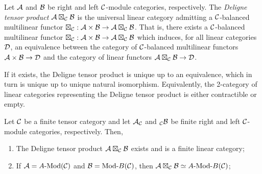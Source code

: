 \documentclass[a4paper]{amsart}
\begin{document}
\begin{definition}
	Let $\mathcal A$ and $\mathcal B$ be right and left $\mathcal C$-module categories, respectively. The {\em Deligne tensor product $\mathcal A \boxtimes_{\mathcal C} \mathcal B$} is the universal linear category admitting a $\mathcal C$-balanced multilinear functor $\boxtimes_{\mathcal C}: \mathcal A \times \mathcal B \to \mathcal A \boxtimes_{\mathcal C} \mathcal B$. That is, there exists a $\mathcal C$-balanced multilinear functor $\boxtimes_{\mathcal C}: \mathcal A \times \mathcal B \to \mathcal A \boxtimes_{\mathcal C} \mathcal B$ which induces, for all linear categories $\mathcal D$, an equivalence between the category of $\mathcal C$-balanced multilinear functors $\mathcal A \times \mathcal B \to \mathcal D$ and the category of linear functors $\mathcal A \boxtimes_{\mathcal C} \mathcal B \to \mathcal D$. 
\end{definition}

If it exists, the Deligne tensor product is unique up to an equivalence, which in turn is unique up to unique natural isomorphism. Equivalently, the 2-category of linear categories representing the Deligne tensor product is either contractible or empty. 

\begin{theorem} \label{thm:DelignePrdtOverATCExists}
	Let $\mathcal C$ be a finite tensor category and let $\mathcal A_{\mathcal C}$ and ${}_{\mathcal C}\mathcal B$ be finite right and left $\mathcal C$-module categories, respectively. Then, 
	\begin{enumerate}
		\item The Deligne tensor product $\mathcal A \boxtimes_{\mathcal C} \mathcal B$ exists and is a finite linear category;
		\item If $\cA = \Mod{A}{}(\cC)$ and $\cB = \Mod{}{B}(\cC)$, then $\cA \boxtimes_{\cC} \cB \simeq \Mod{A }{B}(\cC)$;
	\end{enumerate} 
\end{theorem}
\end{document}
